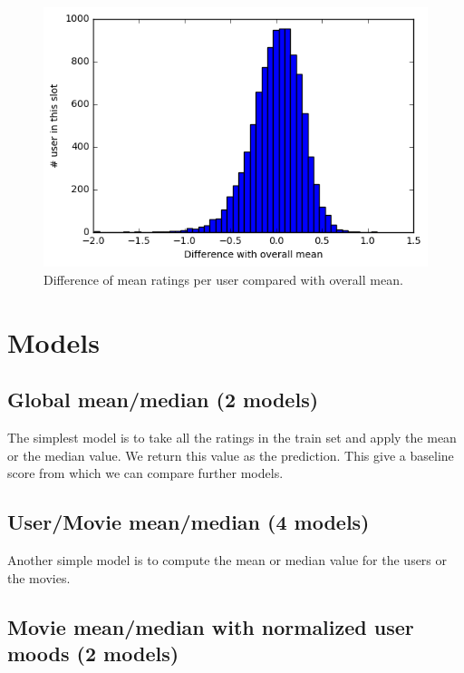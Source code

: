 \documentclass[10pt,conference,compsocconf]{IEEEtran}
\begin{document}
\begin{figure}[htbp] %
  \centering
  \includegraphics[width=\columnwidth]{img/Deviation_mean}
  \caption{Difference of mean ratings per user compared with overall mean.}
  \vspace{-3mm}
  \label{mood}
\end{figure}

\section{Models}

\subsection{Global mean/median (2 models)}

The simplest model is to take all the ratings in the train set and apply the mean or the median value. We return this value as the prediction. This give a baseline score from which we can compare further models.

\subsection{User/Movie mean/median (4 models)}

Another simple model is to compute the mean or median value for the users or the movies.

\subsection{Movie mean/median with normalized user moods (2 models)}
\end{document}
